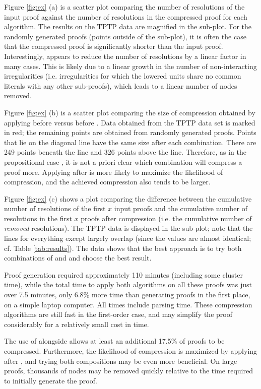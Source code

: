 Figure \ref{fig:ex} (a) is a scatter plot comparing the number of resolutions of the input proof against the number of resolutions in the compressed proof for each algorithm. The results on the TPTP data are magnified in the sub-plot. For the randomly generated proofs (points outside of the sub-plot), it is often the case that the compressed proof is significantly shorter than the input proof. Interestingly, {\GFOLU} appears to reduce the number of resolutions by a linear factor in many cases. This is likely due to a linear growth in the number of non-interacting irregularities (i.e. irregularities for which the lowered units share no common literals with any other sub-proofs), which leads to a linear number of nodes removed.



Figure \ref{fig:ex} (b) is a scatter plot comparing the size of compression obtained by applying {\FORPI} before {\GFOLU} versus {\GFOLU} before {\FORPI}. Data obtained from the TPTP data set is marked in red; the remaining points are obtained from randomly generated proofs. Points that lie on the diagonal line have the same size after each combination. There are 249 points beneath the line and 326 points above the line. Therefore, as in the propositional case \cite{LURPI}, it is not a priori clear which combination will compress a proof more. 
Applying {\FORPI} after {\GFOLU} is more likely to maximize the likelihood of compression, and the achieved compression also tends to be larger.

Figure \ref{fig:ex} (c) shows a plot comparing the difference between the cumulative number of resolutions of the first $x$ input proofs and the cumulative number of resolutions in the first $x$ proofs after compression (i.e. the cumulative number of \emph{removed} resolutions). The TPTP data is displayed in the sub-plot; note that the lines for everything except {\FORPI} largely overlap (since the values are almost identical; cf. Table \ref{tab:results}). The data shows that the best approach is to try both combinations of {\FORPI} and {\GFOLU} and choose the best result.


Proof generation required approximately 110 minutes (including some cluster time), while the total time to apply both algorithms on all these proofs was just over 7.5 minutes, only 6.8\% more time than generating proofs in the first place, on a simple laptop computer. All times include parsing time.  These compression algorithms are still fast in the first-order case, and may simplify the proof considerably for a relatively small cost in time.



The use of {\FORPI} alongside {\GFOLU} allows at least an additional 17.5\% of proofs to be compressed. Furthermore, the likelihood of compression is maximized by applying {\FORPI} after {\GFOLU}, and trying both compositions may be even more beneficial. 
On large proofs, thousands of nodes may be removed quickly relative to the time required to initially generate the proof.



